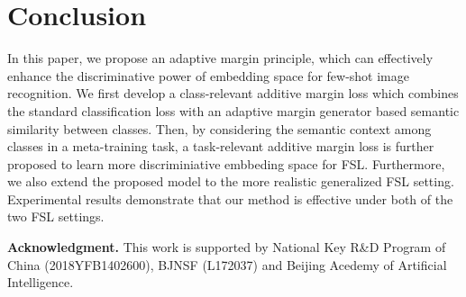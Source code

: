 \documentclass[10pt,twocolumn,letterpaper]{article}
\begin{document}
\section{Conclusion}

In this paper, we propose an adaptive margin principle, which can effectively enhance the discriminative power of embedding space for few-shot image recognition. We first develop a class-relevant additive margin loss which combines the standard classification loss with an adaptive margin generator based semantic similarity between classes. Then, by considering the semantic context among classes in a meta-training task, a task-relevant additive margin loss is further proposed to learn more discriminiative embbeding space for FSL. Furthermore, we also extend the proposed model to the more realistic generalized FSL setting. Experimental results demonstrate that our method is effective under both of the two FSL settings. 


\vspace{0.4cm}\noindent\textbf{Acknowledgment.} This work is supported by National Key R\&D Program of China (2018YFB1402600), BJNSF (L172037) and Beijing Acedemy of Artificial Intelligence.

\clearpage
{
\small


}
\end{document}
